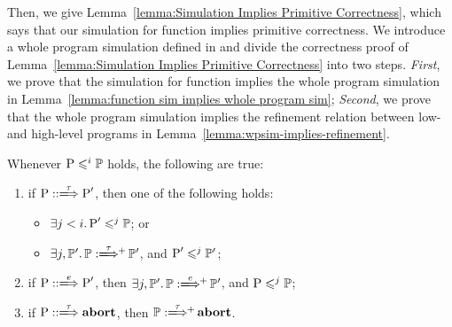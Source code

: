 Then, we give
Lemma~\ref{lemma:Simulation Implies Primitive Correctness},
which says that our simulation for function implies
primitive correctness. We introduce a whole program
simulation defined in \Def{\ref{def:wpsim}} and divide
the correctness proof of
Lemma~\ref{lemma:Simulation Implies Primitive Correctness}
into two steps.
\textit{First}, we prove
that the simulation for function implies
the whole program simulation in
Lemma~\ref{lemma:function sim implies whole program sim};
\textit{Second}, we prove that
the whole program simulation implies the refinement relation
between low- and high-level programs in
Lemma~\ref{lemma:wpsim-implies-refinement}.
\begin{definition}
    \label{def:wpsim}
    Whenever {\em $\text{P} \leqslant^{i} \mathbb{P}$} holds,
    the following are true:
    \begin{enumerate}[1.]
        \small
        \item if {\em $\LGlobTrans{\prog}{\tau}{\prog'}$},
            then one of the following holds:
            \begin{itemize}
                \item {\em $\exists j < i. \,
                        \text{P}' \leqslant^{j} \mathbb{P}$}; or
                \item {\em $\exists j, \HProg'. \,
                    \HGlobMultiTrans{\HProg}{\tau}{+}{\HProg'}$},
                    and {\em $\text{P}' \leqslant^{j} \mathbb{P}'$};
            \end{itemize}
        \item if {\em $\LGlobTrans{\prog}{\event}{\prog'}$},
            then {\em $\exists j, \HProg'. \,
            \HGlobMultiTrans{\HProg}{\event}{+}{\HProg'}$},
            and {\em $\text{P} \leqslant^{j} \mathbb{P}$};
        \item if {\em $\LGlobTrans{\prog}{\tau}{\evtabort}$},
            then {\em $\HGlobMultiTrans{\HProg}{\tau}{+}{\evtabort}$}.
    \end{enumerate}
\end{definition}

